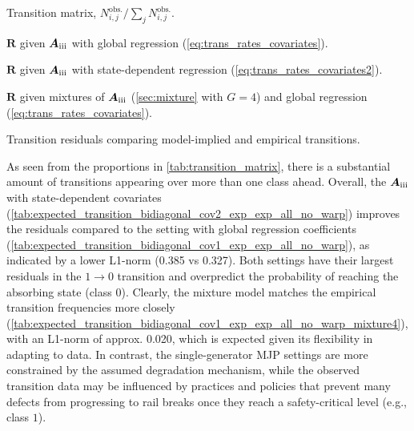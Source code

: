 \documentclass{article}
\newcommand{\RN}[1]{\textup{\uppercase\expandafter{\romannumeral#1}}}
\providecommand{\DIFadd}[1]{{\protect\color{blue} \sf #1}} %
\providecommand{\DIFaddbegin}{} %
\providecommand{\DIFaddend}{} %
\providecommand{\DIFaddFL}[1]{\DIFadd{#1}} %
\begin{document}
\begin{table}[h]
    \begin{subtable}[h]{0.45\textwidth}
        \centering
            
          \caption{\DIFaddFL{Transition matrix, $ N_{i,j}^{\text{obs.}} / \sum_{j}  N_{i,j}^{\text{obs.}}$.}}
       \label{tab:transition_matrix}
    \end{subtable}
    \hfill
    \begin{subtable}[h]{0.45\textwidth}
        \centering
       
        \caption{\DIFaddFL{$\bm R$ given $\bm{A}_{\RN{3}}$ with global regression (\cref{eq:trans_rates_covariates}).}}
        \label{tab:expected_transition_bidiagonal_cov1_exp_exp_all_no_warp}
     \end{subtable}
      \begin{subtable}[h]{0.45\textwidth} 
        \centering
         
        \caption{\DIFaddFL{$\bm R$ given $\bm{A}_{\RN{3}}$ with state-dependent regression (\cref{eq:trans_rates_covariates2}).}}
        \label{tab:expected_transition_bidiagonal_cov2_exp_exp_all_no_warp}
     \end{subtable}
     \hfill 
     \begin{subtable}[h]{0.45\textwidth} 
        \centering 
 
        \caption{\DIFaddFL{$\bm R$ given mixtures of $\bm{A}_{\RN{3}}$ (\cref{sec:mixture} with $G = 4$) and global regression (\cref{eq:trans_rates_covariates}).}}
        \label{tab:expected_transition_bidiagonal_cov1_exp_exp_all_no_warp_mixture4}
     \end{subtable} 
     \caption{\DIFaddFL{Transition residuals comparing model-implied and empirical transitions.}}
     \label{tab:transition_patterns}
\end{table}


\DIFadd{As seen from the proportions in \cref{tab:transition_matrix}, there is a substantial amount of transitions appearing over more than one class ahead. Overall, the $\bm{A}_{\RN{3}}$ with state-dependent covariates (\cref{tab:expected_transition_bidiagonal_cov2_exp_exp_all_no_warp}) improves the residuals compared to the setting with global regression coefficients (\cref{tab:expected_transition_bidiagonal_cov1_exp_exp_all_no_warp}), as indicated by a lower L1-norm (0.385 vs 0.327). Both settings have their largest residuals in the $1 \rightarrow 0$ transition }\DIFaddend and \DIFaddbegin \DIFadd{overpredict the probability of reaching the absorbing state (class $0$). Clearly, the mixture model matches the empirical transition frequencies more closely (\cref{tab:expected_transition_bidiagonal_cov1_exp_exp_all_no_warp_mixture4}), with an L1-norm of approx. 0.020, which is expected given its flexibility in adapting to data. In contrast, the single-generator MJP settings are more constrained by the assumed degradation mechanism, while the observed transition data may be influenced by practices and policies that prevent many defects from progressing to rail breaks once they reach a safety-critical level (e.g., class $1$).
}
\end{document}
